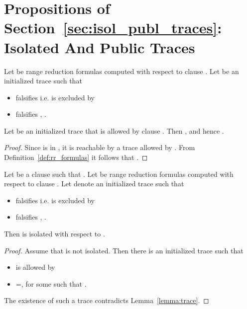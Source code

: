 \section*{Propositions of Section~\ref{sec:isol_publ_traces}: Isolated And Public Traces}
\begin{lemma}
\label{lemma:trace}
Let  be range reduction formulas computed with respect
to clause . Let  be an initialized trace 
such that 
\begin{itemize}
\item {} falsifies  i.e.  is excluded by 
\item {} falsifies , .
\end{itemize} 
  Let  be an initialized
trace  that is allowed by clause .  Then
,  and hence .
\end{lemma}
\begin{proof}
Since  is in , it is reachable by a trace allowed by
. From Definition~\ref{def:rr_formulas} it follows that
.
\end{proof}


\begin{proposition}
Let  be a clause such that . Let
 be range reduction formulas computed with respect to
clause . Let  denote an initialized trace  such
that
\begin{itemize}
\item {} falsifies  i.e.  is excluded by 
\item {} falsifies , .
\end{itemize} 
 Then  is isolated with respect to .
\end{proposition}

\begin{proof}
Assume that  is not isolated. 
Then there is an initialized  trace  such that
\begin{itemize}
\item  is allowed by 
\item {}=, for some  such that .
\end{itemize}
The existence of such a trace contradicts Lemma~\ref{lemma:trace}.
\end{proof}



